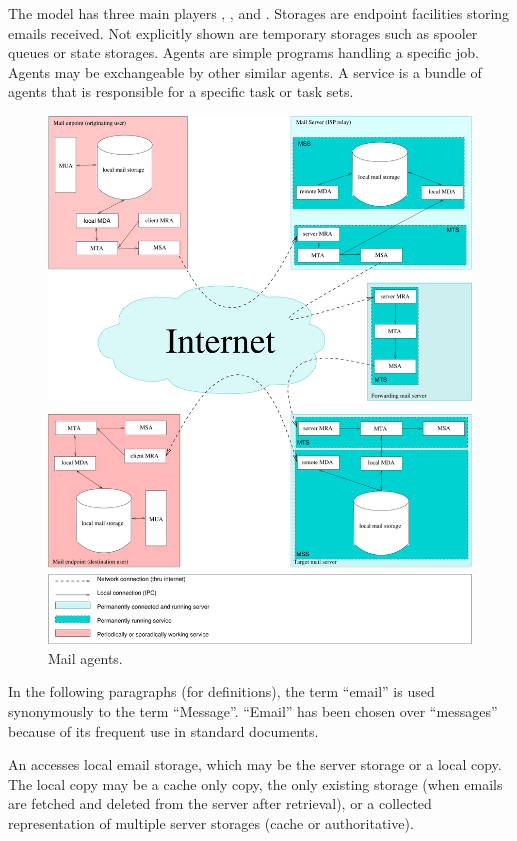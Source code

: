 The model has three main players , , and . Storages are endpoint facilities storing emails received. Not explicitly shown are temporary storages such as spooler queues or state storages. Agents are simple programs handling a specific job. Agents may be exchangeable by other similar agents. A service is a bundle of agents that is responsible for a specific task or task sets.

\begin{figure}[ht!]
	\centering\includegraphics[width=\columnwidth]{inc/MailAgents1.pdf}
	\caption{Mail agents.}
	\label{fig:MailAgents}
\end{figure}

In the following paragraphs (for definitions), the term ``email'' is used synonymously to the term ``Message''.  ``Email'' has been chosen over ``messages'' because of its frequent use in standard documents.

An  accesses local email storage, which may be the server storage or a local copy. The local copy may be a cache only copy, the only existing storage (when emails are fetched and deleted from the server after retrieval), or a collected representation of multiple server storages (cache or authoritative).

